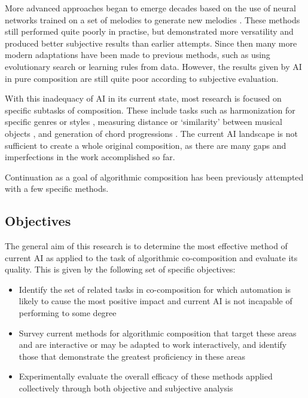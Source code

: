 \documentclass[11pt]{article}
\begin{document}
	More advanced approaches began to emerge decades based on the use of neural networks trained on a set of melodies to generate new melodies \cite[]{todd1989connectionist}. These methods still performed quite poorly in practise, but demonstrated more versatility and produced better subjective results than earlier attempts. Since then many more modern adaptations have been made to previous methods, such as using evolutionary search or learning rules from data. However, the results given by AI in pure composition are still quite poor according to subjective evaluation. 
	
	With this inadequacy of AI in its current state, most research is focused on specific subtasks of composition. These include tasks such as harmonization for specific genres or styles \cite{mcintyre1994bach}, measuring distance or `similarity' between musical objects \cite{horner1991genetic}, and generation of chord progressions \cite{chemillier2004toward}. The current AI landscape is not sufficient to create a whole original composition, as there are many gaps and imperfections in the work accomplished so far. 
	
	Continuation as a goal of algorithmic composition has been previously attempted with a few specific methods. 
	
	\subsection{Objectives}
	
	The general aim of this research is to determine the most effective method of current AI as applied to the task of algorithmic co-composition and evaluate its quality. This is given by the following set of specific objectives:
	 
	\begin{itemize}
		\item Identify the set of related tasks in co-composition for which automation is likely to cause the most positive impact and current AI is not incapable of performing to some degree
		\item Survey current methods for algorithmic composition that target these areas and are interactive or may be adapted to work interactively, and identify those that demonstrate the greatest proficiency in these areas
		\item Experimentally evaluate the overall efficacy of these methods applied collectively through both objective and subjective analysis
	\end{itemize}
	
\end{document}

